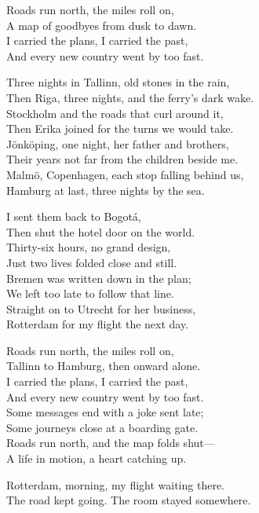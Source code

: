 \begin{lyrics}
Roads run north, the miles roll on,\\
A map of goodbyes from dusk to dawn.\\
I carried the plans, I carried the past,\\
And every new country went by too fast.

Three nights in Tallinn, old stones in the rain,\\
Then Riga, three nights, and the ferry’s dark wake.\\
Stockholm and the roads that curl around it,\\
Then Erika joined for the turns we would take.\\
Jönköping, one night, her father and brothers,\\
Their years not far from the children beside me.\\
Malmö, Copenhagen, each stop falling behind us,\\
Hamburg at last, three nights by the sea.

I sent them back to Bogotá,\\
Then shut the hotel door on the world.\\
Thirty-six hours, no grand design,\\
Just two lives folded close and still.\\
Bremen was written down in the plan;\\
We left too late to follow that line.\\
Straight on to Utrecht for her business,\\
Rotterdam for my flight the next day.

Roads run north, the miles roll on,\\
Tallinn to Hamburg, then onward alone.\\
I carried the plans, I carried the past,\\
And every new country went by too fast.\\
Some messages end with a joke sent late;\\
Some journeys close at a boarding gate.\\
Roads run north, and the map folds shut—\\
A life in motion, a heart catching up.

Rotterdam, morning, my flight waiting there.\\
The road kept going. The room stayed somewhere.
\end{lyrics}

